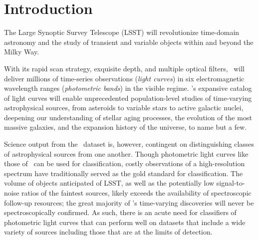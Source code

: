 \section{Introduction}
\label{sec:intro}

The Large Synoptic Survey Telescope (LSST) will revolutionize time-domain astronomy
and the study of transient and variable objects within and beyond the Milky Way.

With its rapid scan strategy, exquisite depth, and multiple optical filters, \lsst\ will deliver millions of time-series observations (\textit{light curves}) in six electromagnetic wavelength ranges (\textit{photometric bands}) in the visible regime.
\lsst's expansive catalog of light curves will enable unprecedented population-level studies of time-varying astrophysical sources, from asteroids to variable stars to active galactic nuclei, deepening our understanding of stellar aging processes, the evolution of the most massive galaxies, and the expansion history of the universe, to name but a few.

Science output from the \lsst\ dataset is, however, contingent on distinguishing classes of astrophysical sources from one another.
Though photometric light curves like those of \lsst\ can be used for classification, costly observations of a high-resolution spectrum have traditionally served as the gold standard for classification.
The volume of objects anticipated of LSST, as well as the potentially low signal-to-noise ratios of the faintest sources, likely exceeds the availability of spectroscopic follow-up resources; the great majority of \lsst's time-varying discoveries will never be spectroscopically confirmed.
As such, there is an acute need for classifiers of photometric light curves that can perform well on datasets that include a wide variety of sources including those that are at the limits of detection.

